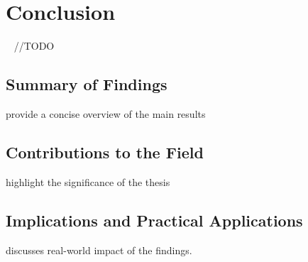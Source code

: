 \chapter{Conclusion}~\label{ch:conclusion}
//TODO

\section{Summary of Findings}
provide a concise overview of the main results

\section{Contributions to the Field}
highlight the significance of the thesis

\section{Implications and Practical Applications}
discusses real-world impact of the findings.